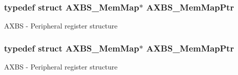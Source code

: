 \subsubsection[{\texorpdfstring{A\+X\+B\+S\+\_\+\+Mem\+Map\+Ptr}{AXBS_MemMapPtr}}]{\setlength{\rightskip}{0pt plus 5cm}typedef struct {\bf A\+X\+B\+S\+\_\+\+Mem\+Map}$\ast$ {\bf A\+X\+B\+S\+\_\+\+Mem\+Map\+Ptr}}\hypertarget{group___a_x_b_s___peripheral_ga8f768bd75d5c94d51b05e9ef4a38ea33}{}\label{group___a_x_b_s___peripheral_ga8f768bd75d5c94d51b05e9ef4a38ea33}
A\+X\+BS -\/ Peripheral register structure 
\subsubsection[{\texorpdfstring{A\+X\+B\+S\+\_\+\+Mem\+Map\+Ptr}{AXBS_MemMapPtr}}]{\setlength{\rightskip}{0pt plus 5cm}typedef struct {\bf A\+X\+B\+S\+\_\+\+Mem\+Map}$\ast$ {\bf A\+X\+B\+S\+\_\+\+Mem\+Map\+Ptr}}\hypertarget{group___a_x_b_s___peripheral_ga8f768bd75d5c94d51b05e9ef4a38ea33}{}\label{group___a_x_b_s___peripheral_ga8f768bd75d5c94d51b05e9ef4a38ea33}
A\+X\+BS -\/ Peripheral register structure 